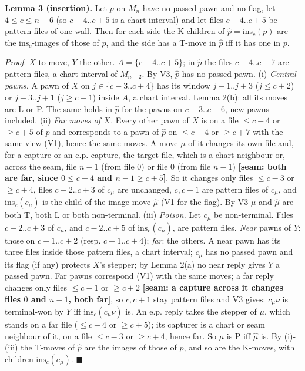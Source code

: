 \textbf{Lemma 3 (insertion).} Let $p$ on $M_n$ have no passed pawn and no flag, let $4\le c\le n-6$ (so $c-4..c+5$ is a chart interval) and let files $c-4..c+5$ be pattern files of one wall. Then for each side the K-children of $\hat p=\mathrm{ins}_c(p)$ are the $\mathrm{ins}_c$-images of those of $p$, and the side has a T-move in $\hat p$ iff it has one in $p$.

\emph{Proof}. $X$ to move, $Y$ the other. $A=\{c-4..c+5\}$; in $\hat p$ the files $c-4..c+7$ are pattern files, a chart interval of $M_{n+2}$. By V3, $\hat p$ has no passed pawn. (i) \emph{Central pawns.} A pawn of $X$ on $j\in\{c-3..c+4\}$ has its window $j-1..j+3$ ($j\le c+2$) or $j-3..j+1$ ($j\ge c-1$) inside $A$, a chart interval. Lemma 2(b): all its moves are L or P. The same holds in $\hat p$ for the pawns on $c-3..c+6$, new pawns included. (ii) \emph{Far moves of $X$.} Every other pawn of $X$ is on a file $\le c-4$ or $\ge c+5$ of $p$ and corresponds to a pawn of $\hat p$ on $\le c-4$ or $\ge c+7$ with the same view (V1), hence the same moves. A move $\mu$ of it changes its own file and, for a capture or an e.p. capture, the target file, which is a chart neighbour or, across the seam, file $n-1$ (from file 0) or file 0 (from file $n-1$) \textbf{[seam: both are far, since $0\le c-4$ and $n-1\ge c+5$]}. So it changes only files $\le c-3$ or $\ge c+4$, files $c-2..c+3$ of $c_\mu$ are unchanged, $c,c+1$ are pattern files of $c_\mu$, and $\mathrm{ins}_c(c_\mu)$ is the child of the image move $\hat\mu$ (V1 for the flag). By V3 $\mu$ and $\hat\mu$ are both T, both L or both non-terminal. (iii) \emph{Poison.} Let $c_\mu$ be non-terminal. Files $c-2..c+3$ of $c_\mu$, and $c-2..c+5$ of $\mathrm{ins}_c(c_\mu)$, are pattern files. \emph{Near} pawns of $Y$: those on $c-1..c+2$ (resp. $c-1..c+4$); \emph{far}: the others. A near pawn has its three files inside those pattern files, a chart interval; $c_\mu$ has no passed pawn and its flag (if any) protects $X$'s stepper; by Lemma 2(a) no near reply gives $Y$ a passed pawn. Far pawns correspond (V1) with the same moves; a far reply changes only files $\le c-1$ or $\ge c+2$ \textbf{[seam: a capture across it changes files $0$ and $n-1$, both far]}, so $c,c+1$ stay pattern files and V3 gives: $c_\mu\nu$ is terminal-won by $Y$ iff $\mathrm{ins}_c(c_\mu\nu)$ is. An e.p. reply takes the stepper of $\mu$, which stands on a far file ($\le c-4$ or $\ge c+5$); its capturer is a chart or seam neighbour of it, on a file $\le c-3$ or $\ge c+4$, hence far. So $\mu$ is P iff $\hat\mu$ is. By (i)-(iii) the T-moves of $\hat p$ are the images of those of $p$, and so are the K-moves, with children $\mathrm{ins}_c(c_\mu)$. $\blacksquare$

